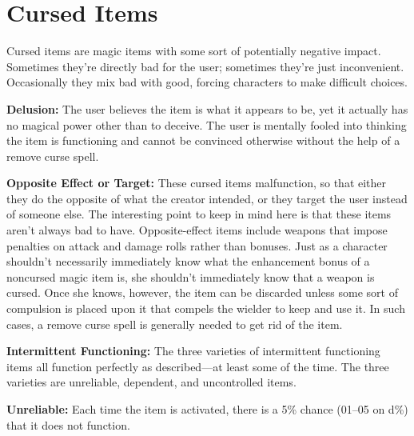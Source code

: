 \section{Cursed Items}
Cursed items are magic items with some sort of potentially negative impact. Sometimes they're directly bad for the user; sometimes they're just inconvenient. Occasionally they mix bad with good, forcing characters to make difficult choices.


\textbf{Delusion:} The user believes the item is what it appears to be, yet it actually has no magical power other than to deceive. The user is mentally fooled into thinking the item is functioning and cannot be convinced otherwise without the help of a remove curse spell.

\textbf{Opposite Effect or Target:} These cursed items malfunction, so that either they do the opposite of what the creator intended, or they target the user instead of someone else. The interesting point to keep in mind here is that these items aren't always bad to have. Opposite-effect items include weapons that impose penalties on attack and damage rolls rather than bonuses. Just as a character shouldn't necessarily immediately know what the enhancement bonus of a noncursed magic item is, she shouldn't immediately know that a weapon is cursed. Once she knows, however, the item can be discarded unless some sort of compulsion is placed upon it that compels the wielder to keep and use it. In such cases, a remove curse spell is generally needed to get rid of the item.

\textbf{Intermittent Functioning:} The three varieties of intermittent functioning items all function perfectly as described—at least some of the time. The three varieties are unreliable, dependent, and uncontrolled items.

\textbf{Unreliable:} Each time the item is activated, there is a 5\% chance (01--05 on d\%) that it does not function.

